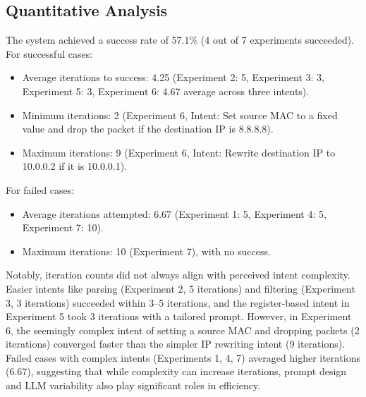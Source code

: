 \documentclass[sigconf]{acmart}
\begin{document}
\subsection*{Quantitative Analysis}
The system achieved a success rate of 57.1\% (4 out of 7 experiments succeeded). \\ For successful cases:
\begin{itemize}
    \item Average iterations to success: 4.25 (Experiment 2: 5, Experiment 3: 3, Experiment 5: 3, Experiment 6: 4.67 average across three intents).
    \item Minimum iterations: 2 (Experiment 6, Intent: Set source MAC to a fixed value and drop the packet if the destination IP is 8.8.8.8).
    \item Maximum iterations: 9 (Experiment 6, Intent: Rewrite destination IP to 10.0.0.2 if it is 10.0.0.1).
\end{itemize}
For failed cases:
\begin{itemize}
    \item Average iterations attempted: 6.67 (Experiment 1: 5, Experiment 4: 5, Experiment 7: 10).
    \item Maximum iterations: 10 (Experiment 7), with no success.
\end{itemize}

Notably, iteration counts did not always align with perceived intent complexity. Easier intents like parsing (Experiment 2, 5 iterations) and filtering (Experiment 3, 3 iterations) succeeded within 3–5 iterations, and the register-based intent in Experiment 5 took 3 iterations with a tailored prompt. However, in Experiment 6, the seemingly complex intent of setting a source MAC and dropping packets (2 iterations) converged faster than the simpler IP rewriting intent (9 iterations). Failed cases with complex intents (Experiments 1, 4, 7) averaged higher iterations (6.67), suggesting that while complexity can increase iterations, prompt design and LLM variability also play significant roles in efficiency.
\end{document}
